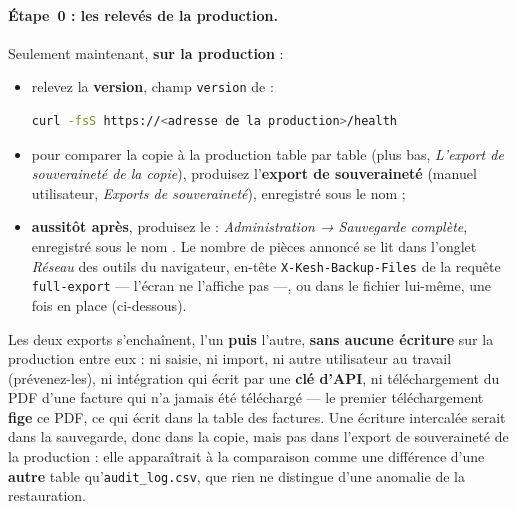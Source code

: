 \documentclass[a4paper,11pt,oneside]{article}
\begin{document}
\paragraph{Étape~0 : les relevés de la production.} Seulement maintenant, \textbf{sur la production} :
\begin{itemize}
    \item relevez la \textbf{version}, champ \texttt{version} de :
\begin{lstlisting}[language=bash]
curl -fsS https://<adresse de la production>/health
\end{lstlisting}
    \item pour comparer la copie à la production table par table (plus bas, \emph{L'export de souveraineté de la copie}), produisez l'\textbf{export de souveraineté} (manuel utilisateur, \emph{Exports de souveraineté}), enregistré sous le nom  ;
    \item \textbf{aussitôt après}, produisez le  : \emph{Administration → Sauvegarde complète}, enregistré sous le nom . Le nombre de pièces annoncé se lit dans l'onglet \emph{Réseau} des outils du navigateur, en-tête \texttt{X-Kesh-Backup-Files} de la requête \texttt{full-export} --- l'écran ne l'affiche pas ---, ou dans le fichier lui-même, une fois en place (ci-dessous).
\end{itemize}
Les deux exports s'enchaînent, l'un \textbf{puis} l'autre, \textbf{sans aucune écriture} sur la production entre eux : ni saisie, ni import, ni autre utilisateur au travail (prévenez-les), ni intégration qui écrit par une \textbf{clé d'API}, ni téléchargement du PDF d'une facture qui n'a jamais été téléchargé --- le premier téléchargement \textbf{fige} ce PDF, ce qui écrit dans la table des factures. Une écriture intercalée serait dans la sauvegarde, donc dans la copie, mais pas dans l'export de souveraineté de la production : elle apparaîtrait à la comparaison comme une différence d'une \textbf{autre} table qu'\texttt{audit\_log.csv}, que rien ne distingue d'une anomalie de la restauration.
\end{document}
